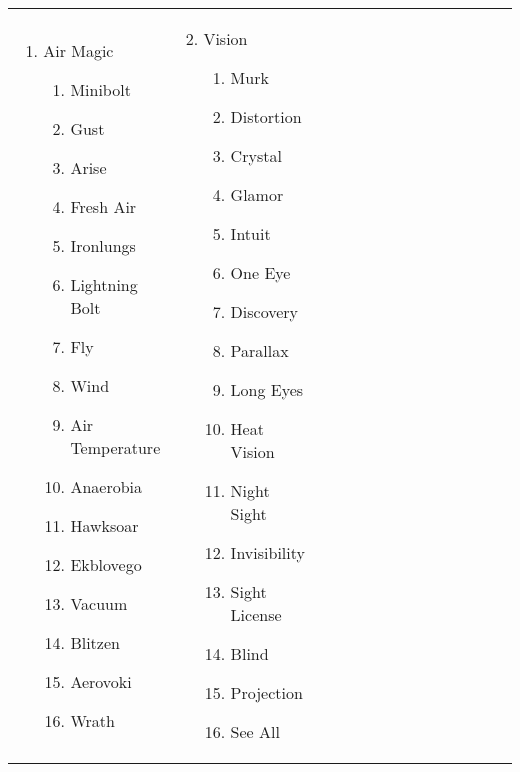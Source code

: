 \renewcommand{\labelenumii}{\arabic{enumii}.}
\begin{tabular}{@{} p{0.25\linewidth} p{0.25\linewidth} p{0.25\linewidth} p{0.25\linewidth}}
\begin{enumerate}
	\item Air Magic
	\begin{enumerate}
		\item Minibolt
		\item Gust
		\item Arise
		\item Fresh Air
		\item Ironlungs
		\item Lightning Bolt
		\item Fly
		\item Wind
		\item Air Temperature
		\item Anaerobia
		\item Hawksoar
		\item Ekblovego
		\item Vacuum
		\item Blitzen
		\item Aerovoki
		\item Wrath
	\end{enumerate}
\end{enumerate} &
\begin{enumerate}
	\setcounter{enumi}{1}
	\item Vision
	\begin{enumerate}
		\item Murk
		\item Distortion
		\item Crystal
		\item Glamor
		\item Intuit
		\item One Eye
		\item Discovery
		\item Parallax
		\item Long Eyes
		\item Heat Vision
		\item Night Sight
		\item Invisibility
		\item Sight License
		\item Blind
		\item Projection
		\item See All
	\end{enumerate}
\end{enumerate} &

\end{tabular}
